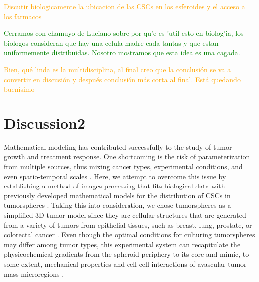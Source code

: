 \documentclass[fleqn,10pt]{wlscirep}
\begin{document}
\textcolor{orange}{Discutir biologicamente la ubicacion de las CSCs en los esferoides y el acceso a los farmacos}

\textcolor{green}{Cerramos con chamuyo de Luciano sobre por qu'e es 'util esto en biolog'ia, los biologos consideran que hay una celula madre cada tantas y que estan uniformemente distribuidas. Nosotro mostramos que esta idea es una cagada}.

\textcolor{orange}{Bien, qué linda es la multidisciplina, al final creo que la conclusión se va a convertir en discusión y después conclusión más corta al final. Está quedando buenísimo} 

\section*{Discussion2}

Mathematical modeling has contributed successfully to the study of tumor growth and treatment response. One shortcoming is the risk of parameterization from multiple sources, thus mixing cancer types, experimental conditions, and even spatio-temporal scales \cite{Brady2019}. Here, we attempt to overcome this issue by establishing a method of images processing that fits biological data with previously developed mathematical models for the distribution of CSCs in tumorspheres \cite{barberis2021percolation}. Taking this into consideration, we chose tumorspheres as a simplified 3D tumor model since they are cellular structures that are generated from a variety of tumors from epithelial tissues, such as breast, lung, prostate, or colorectal cancer \cite{Zanoni2020}. Even though the optimal conditions for culturing tumorspheres may differ among tumor types, this experimental system can recapitulate the physicochemical gradients from the spheroid periphery to its core and mimic, to some extent, mechanical properties and cell-cell interactions of avascular tumor mass microregions \cite{Rolver2019,Zanoni2020}. 
\end{document}
